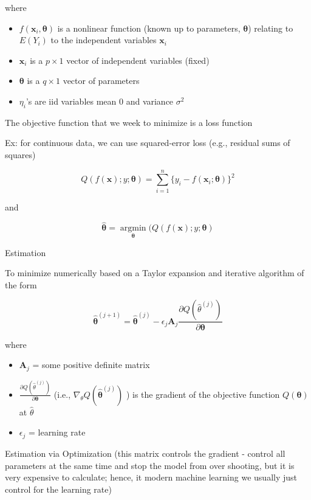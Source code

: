 \documentclass[
]{book}
\begin{document}
where

\begin{itemize}
\item
  \(f(\mathbf{x}_i , \mathbf{\theta})\) is a nonlinear function (known up to parameters, \(\mathbf{\theta}\)) relating to \(E(Y_i)\) to the independent variables \(\mathbf{x}_i\)
\item
  \(\mathbf{x}_i\) is a \(p \times 1\) vector of independent variables (fixed)
\item
  \(\mathbf{\theta}\) is a \(q \times 1\) vector of parameters
\item
  \(\eta_i\)'s are iid variables mean 0 and variance \(\sigma^2\)
\end{itemize}

The objective function that we week to minimize is a loss function

Ex: for continuous data, we can use squared-error loss (e.g., residual sums of squares)

\[
Q(f(\mathbf{x});y; \mathbf{\theta}) = \sum_{i=1}^n \{ y_i - f(\mathbf{x}_i; \mathbf{\theta})\}^2
\]

and

\[
\hat{\mathbf{\theta}} = \underset{\mathbf{\theta}}{\operatorname{argmin}} ( Q(f(\mathbf{x}); y; \mathbf{\theta})
\]

Estimation

To minimize numerically based on a Taylor expansion and iterative algorithm of the form

\[
\hat{\mathbf{\theta}}^{(j + 1)} = \hat{\mathbf{\theta}}^{(j)} - \epsilon_j \mathbf{A}_j \frac{\partial Q (\hat{\theta}^{(j)})}{\partial \mathbf{\theta}}
\]

where

\begin{itemize}
\item
  \(\mathbf{A}_j\) = some positive definite matrix
\item
  \(\frac{\partial Q (\hat{\theta}^{(j)})}{\partial \mathbf{\theta}}\) (i.e., \(\nabla_\theta Q(\hat{\mathbf{\theta}}^{(j)})\) ) is the gradient of the objective function \(Q(\mathbf{\theta})\) at \(\hat{\theta}\)
\item
  \(\epsilon_j\) = learning rate
\end{itemize}

Estimation via Optimization (this matrix controls the gradient - control all parameters at the same time and stop the model from over shooting, but it is very expensive to calculate; hence, it modern machine learning we usually just control for the learning rate)
\end{document}
